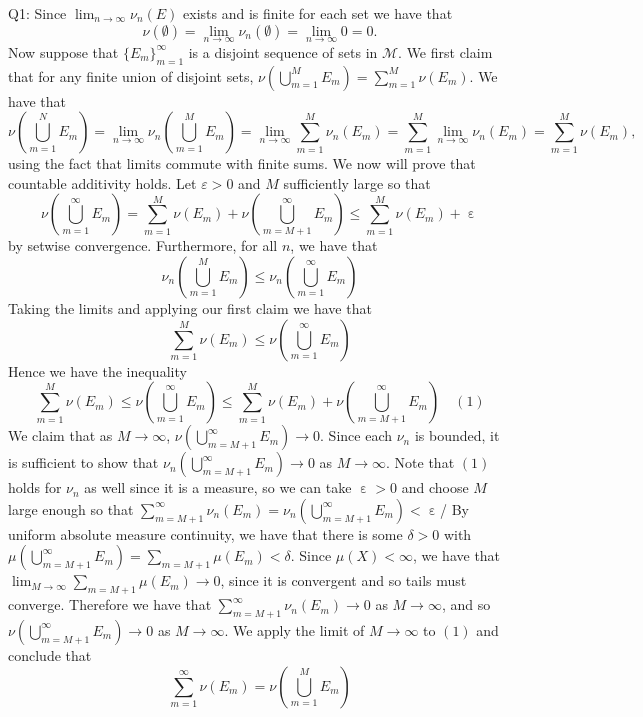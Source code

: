 \documentclass[letterpaper]{article}
\DeclareMathOperator{\ep}{\varepsilon}
\begin{document}
\noindent
Q1: Since $\lim_{n \to \infty} \nu_n(E)$ exists and is finite for each set we have that $$\nu(\emptyset) = \lim_{n\to \infty} \nu_n(\emptyset) = \lim_{n\to \infty} 0 =0.$$ Now suppose that $\{E_m\}_{m=1}^\infty$ is a disjoint sequence of sets in $\mathcal{M}. $ 
We first claim that for any finite union of disjoint sets, $\nu(\bigcup_{m=1}^M E_m) = \sum_{m=1}^M \nu(E_m)$. We have that $$\nu(\bigcup_{m=1}^N E_m) = \lim_{n\to \infty} \nu_n(\bigcup_{m=1}^M E_m) = \lim_{n\to \infty} \sum_{m=1}^M \nu_n (E_m) = \sum_{m=1}^M \lim_{n\to \infty} \nu_n(E_m)  = \sum_{m=1}^M \nu(E_m),$$
using the fact that limits commute with finite sums. We now will prove that countable additivity holds. Let $\varepsilon>0$ and $M$ sufficiently large so that $$\nu(\bigcup_{m=1}^\infty E_m) = \sum_{m=1}^M \nu(E_m) + \nu(\bigcup_{m=M+1}^{\infty} E_m) \leq \sum_{m=1}^M \nu(E_m) + \ep $$
by setwise convergence. Furthermore, for all $n$, we have that $$\nu_n(\bigcup_{m=1}^M E_m) \leq \nu_n(\bigcup_{m=1}^\infty E_m) $$
Taking the limits and applying our first claim we have that $$\sum_{m=1}^M \nu(E_m) \leq \nu(\bigcup_{m=1}^\infty E_m)$$
Hence we have the inequality $$\sum_{m=1}^M \nu(E_m)\leq \nu(\bigcup_{m=1}^\infty E_m) \leq \sum_{m=1}^M \nu(E_m) + \nu(\bigcup_{m=M+1}^\infty E_m) \quad (1)$$
We claim that as $M\to \infty$, $\nu(\bigcup_{m=M+1}^\infty E_m)\to 0$. Since each $\nu_n$ is bounded, it is sufficient to show that $\nu_n(\bigcup_{m=M+1}^\infty E_m) \to 0$ as $M \to \infty$. Note that $(1)$ holds for $\nu_n$ as well since it is a measure, so we can take $\ep>0$ and choose $M$ large enough so that $\sum_{m=M+1}^\infty \nu_n(E_m) = \nu_n(\bigcup_{m=M+1}^\infty E_m) < \ep$/ By uniform absolute measure continuity, we have that there is some $\delta>0$
with $\mu(\bigcup_{m=M+1}^\infty E_m)  = \sum_{m=M+1}\mu(E_m) < \delta$. Since $\mu(X)<\infty$, we have that $\lim_{M\to \infty} \sum_{m=M+1}\mu(E_m)\to 0$, since it is convergent and so tails must converge. Therefore we have that $\sum_{m=M+1}^\infty \nu_n(E_m)\to 0$ as $M\to \infty$, and so $\nu(\bigcup_{m=M+1}^\infty E_m) \to 0 $ as $M\to \infty$. We apply the limit of $M\to \infty$ to $(1)$ and conclude that $$\sum_{m=1}^\infty \nu(E_m) = \nu(\bigcup_{m=1}^M E_m)$$
\end{document}
